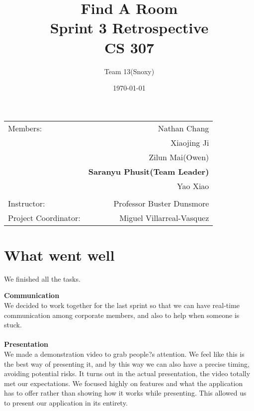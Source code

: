 \documentclass[12pt]{article}
\title{\textbf{Find A Room} \\ Sprint 3 Retrospective \\ CS 307} %
\author{Team \textsc{13}(Snoxy)} %
\date{\today} %
\begin{document}
\maketitle %

\begin{center}
\begin{tabular}{l r}
Members: & Nathan Chang \\ %
& Xiaojing Ji \\
& Zilun Mai(Owen) \\
& \textbf{Saranyu Phusit(Team Leader)} \\
& Yao Xiao \\
\\
\bigskip
Instructor: & Professor Buster Dunsmore \\%
Project Coordinator: & Miguel Villarreal-Vasquez %

\end{tabular}
\end{center}

\newpage




\newpage
\section{What went well}

We finished all the tasks.

\textbf{Communication}\\ We decided to work together for the last sprint so that we can have real-time communication among corporate members, and also to help when someone is stuck. \\ \\

\textbf{Presentation}\\ We made a demonstration video to grab people?s attention. We feel like this is the best way of presenting it, and by this way we can also have a precise timing, avoiding potential risks. It turns out in the actual presentation, the video totally met our expectations. We focused highly on features and what the application has to offer rather than showing how it works while presenting. This allowed us to present our application in its entirety.  \\ \\
\end{document}
